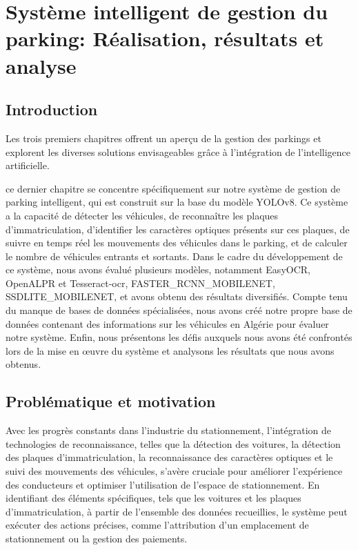 \chapter{Système intelligent de gestion du parking: Réalisation, résultats et analyse}
\section{Introduction}
Les trois premiers chapitres offrent un aperçu de la gestion des parkings et explorent les diverses solutions envisageables grâce à l’intégration de l'intelligence artificielle. 

ce dernier chapitre se concentre spécifiquement sur notre système de gestion de parking intelligent, qui est construit sur la base du modèle YOLOv8. Ce système a la capacité de détecter les véhicules, de reconnaître les plaques d'immatriculation, d'identifier les caractères optiques présents sur ces plaques, de suivre en temps réel les mouvements des véhicules dans le parking, et de calculer le nombre de véhicules entrants et sortants. 
Dans le cadre du développement de ce système, nous avons évalué plusieurs modèles, notamment EasyOCR\cite{ch4_EasyOCRV83}, OpenALPR\cite{ch4_OpenALPR81} et Tesseract-ocr\cite{tesseract-ocr-guide}, FASTER\_RCNN\_MOBILENET, SSDLITE\_MOBILENET, et avons obtenu des résultats diversifiés. Compte tenu du manque de bases de données spécialisées, nous avons créé notre propre base de données contenant des informations sur les véhicules en Algérie pour évaluer notre système. Enfin, nous présentons les défis auxquels nous avons été confrontés lors de la mise en œuvre du système et analysons les résultats que nous avons obtenus.

\section{Problématique et motivation}

Avec les progrès constants dans l'industrie du stationnement, l'intégration de technologies de reconnaissance, telles que la détection des voitures, la détection des plaques d'immatriculation, la reconnaissance des caractères optiques et le suivi des mouvements des véhicules, s'avère cruciale pour améliorer l'expérience des conducteurs et optimiser l'utilisation de l'espace de stationnement. En identifiant des éléments spécifiques, tels que les voitures et les plaques d'immatriculation, à partir de l'ensemble des données recueillies, le système peut exécuter des actions précises, comme l'attribution d'un emplacement de stationnement ou la gestion des paiements.

